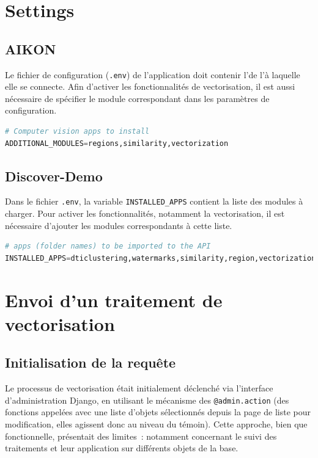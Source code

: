 \section{Settings}

	\subsection{AIKON}
	
Le fichier de configuration (\texttt{.env}) de l'application doit contenir l'\URL de l'\api à laquelle elle se connecte. Afin d'activer les fonctionnalités de vectorisation, il est aussi nécessaire de spécifier le module correspondant dans les paramètres de configuration.  

	\begin{lstlisting}[language=python, frame=single, breaklines=true, caption={Extrait du fichier de configuration de l'application.}]
# Computer vision apps to install
ADDITIONAL_MODULES=regions,similarity,vectorization
 \end{lstlisting}


	\subsection{Discover-Demo}
	
Dans le fichier \texttt{.env}, la variable \texttt{INSTALLED\_APPS} contient la liste des modules à charger. Pour activer les fonctionnalités, notamment la vectorisation, il est nécessaire d'ajouter les modules correspondants à cette liste.
	
	\begin{lstlisting}[language=python, frame=single, breaklines=true, caption={Extrait du fichier de configuration de l'\api.}]
# apps (folder names) to be imported to the API
INSTALLED_APPS=dticlustering,watermarks,similarity,region,vectorization\end{lstlisting}

\section{Envoi d'un traitement de vectorisation}

\subsection{Initialisation de la requête}

Le processus de vectorisation était initialement déclenché via l'interface d'administration Django, en utilisant le mécanisme des \texttt{@admin.action} (des fonctions appelées avec une liste d’objets sélectionnés depuis la page de liste pour modification, elles agissent donc au niveau du témoin). Cette approche, bien que fonctionnelle, présentait des limites~: notamment concernant le suivi des traitements et leur application sur différents objets de la base.

